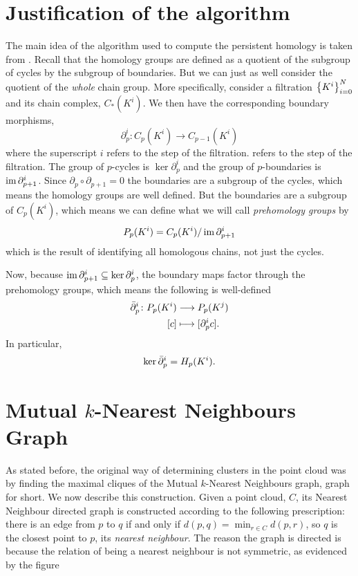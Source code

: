 \documentclass[../main.tex]{subfiles}
\begin{document}
\section{Justification of the algorithm}
The main idea of the algorithm used to compute the persistent homology is taken from
\cite{campos}. Recall that the homology groups are defined as a quotient of the subgroup
of cycles by the subgroup of boundaries. But we can just as well consider the quotient of the \emph{whole} chain group. More
specifically, consider a filtration \( \left\{ K^i \right\}_{i = 0}^N \) and its chain
complex, \( C_\ast(K^i) \). We then have the corresponding boundary morphisms,
\begin{equation*}
	\partial_p^i \colon C_p(K^i) \to C_{p-1}(K^i)
\end{equation*}
where the superscript \( i \) refers to the step of the filtration.  refers to the step of
the filtration. The group of \( p \)-cycles is \( \ker{\partial_p^i} \) and the group of
\( p \)-boundaries is \( \operatorname{im}{\partial_{p+1}^i} \). Since \( \partial_p \circ \partial_{p+1}
= 0 \) the boundaries are a subgroup of the cycles, which means the homology groups are
well defined. But the boundaries are a subgroup of \( C_p(K^i) \), which means we can
define what we will call \emph{prehomology groups} by
\begin{equation*}
	P_p(K^i) = C_p(K^i) / \operatorname{im}{\partial_{p+1}^i}
\end{equation*}
which is the result of identifying all homologous chains, not just the cycles. 

Now, because \( \operatorname{im}{\partial_{p+1}^i} \subseteq \ker{\partial_p^i} \), the boundary maps
factor through the prehomology groups, which means the following is well-defined
\begin{align*}
	\bar{\partial}_{p}^{i} \colon P_p(K^i) & \longrightarrow P_p(K^j) \\
	[c] & \longmapsto [\partial_p^i c]. 
\end{align*}
In particular,
\begin{equation*}
	\ker{\bar{\partial}_{p}^{i}} = H_p(K^i). 
\end{equation*}



\section{Mutual \( k \)-Nearest Neighbours Graph}
As stated before, the original way of determining clusters in the point cloud was by
finding the maximal cliques of the Mutual \( k \)-Nearest Neighbours graph, \MKNN 
graph for short. We now describe this construction. Given a point cloud, \( C \), its 
Nearest Neighbour directed graph is constructed according to the following
prescription: there is an edge from \( p \) to \( q \) if and only if \( d(p,q) = \min_{r
	\in C} d(p,r) \), so \( q \) is the closest point to \( p \), its \emph{nearest
neighbour}. The reason the graph is directed is because the relation of being a nearest
neighbour is not symmetric, as evidenced by the figure
\end{document}
